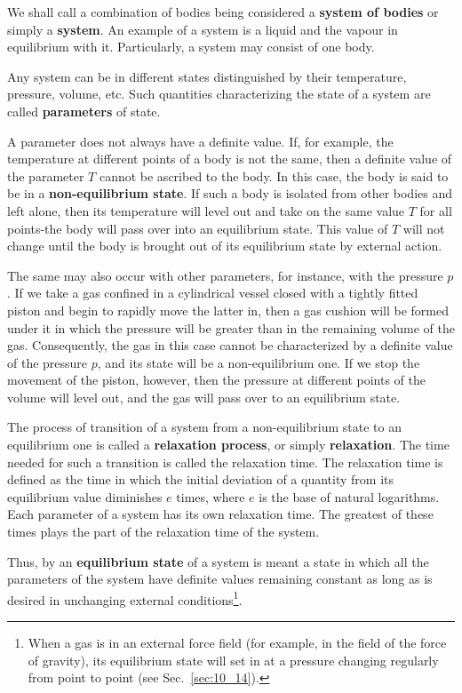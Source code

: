 We shall call a combination of bodies being considered a \textbf{system of bodies} or simply a \textbf{system}. An example of a system is a liquid and the vapour in equilibrium with it. Particularly, a system may consist of one body.

Any system can be in different states distinguished by their temperature, pressure, volume, etc. Such quantities characterizing the state of a system are called \textbf{parameters} of state.

A parameter does not always have a definite value. If, for example, the temperature at different points of a body is not the same, then a definite value of the parameter $T$ cannot be ascribed to the body. In this case, the body is said to be in a \textbf{non-equilibrium state}. If such a body is isolated from other bodies and left alone, then its temperature will level out and take on the same value $T$ for all points-the body will pass over into an equilibrium state. This value of $T$ will not change until the body is brought out of its equilibrium state by external action.

The same may also occur with other parameters, for instance, with the pressure $p$. If we take a gas confined in a cylindrical vessel closed with a tightly fitted piston and begin to rapidly move the latter in, then a gas cushion will be formed under it in which the pressure will be greater than in the remaining volume of the gas. Consequently, the gas in this case cannot be characterized by a definite value of the pressure $p$, and its state will be a non-equilibrium one. If we stop the movement of the piston, however, then the pressure at different points of the volume will level out, and the gas will pass over to an equilibrium state.

The process of transition of a system from a non-equilibrium state to an equilibrium one is called a \textbf{relaxation process}, or simply \textbf{relaxation}. The time needed for such a transition is called the relaxation time. The relaxation time is defined as the time in which the initial deviation of a quantity from its equilibrium value diminishes $e$ times, where $e$ is the base of natural logarithms. Each parameter of a system has its own relaxation time. The greatest of these times plays the part of the relaxation time of the system.

Thus, by an \textbf{equilibrium state} of a system is meant a state in which all the parameters of the system have definite values remaining constant as long as is desired in unchanging external conditions\footnote{When a gas is in an external force field (for example, in the field of the force of gravity), its equilibrium state will set in at a pressure changing regularly from point to point (see Sec.~\ref{sec:10_14}).}.

